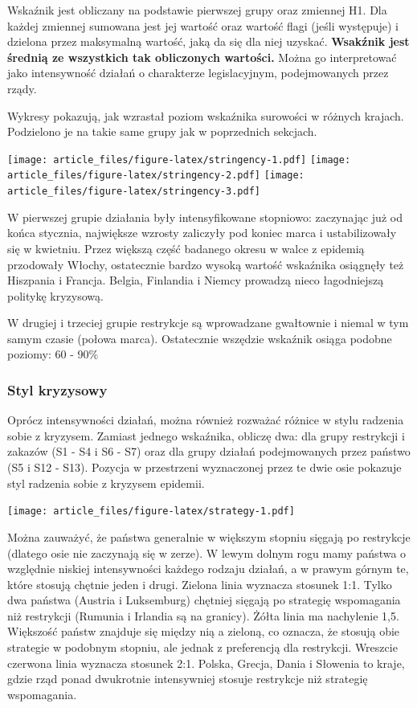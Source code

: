 \documentclass[
]{article}
\begin{document}
Wskaźnik jest obliczany na podstawie pierwszej grupy oraz zmiennej H1.
Dla każdej zmiennej sumowana jest jej wartość oraz wartość flagi (jeśli
występuje) i dzielona przez maksymalną wartość, jaką da się dla niej
uzyskać. \textbf{Wsakźnik jest średnią ze wszystkich tak obliczonych
wartości.} Można go interpretować jako intensywność działań o
charakterze legislacyjnym, podejmowanych przez rządy.

Wykresy pokazują, jak wzrastał poziom wskaźnika surowości w różnych
krajach. Podzielono je na takie same grupy jak w poprzednich sekcjach.

\texttt{[image: article\_files/figure-latex/stringency-1.pdf]}
\texttt{[image: article\_files/figure-latex/stringency-2.pdf]}
\texttt{[image: article\_files/figure-latex/stringency-3.pdf]}

W pierwszej grupie działania były intensyfikowane stopniowo: zaczynając
już od końca stycznia, największe wzrosty zaliczyły pod koniec marca i
ustabilizowały się w kwietniu. Przez większą część badanego okresu w
walce z epidemią przodowały Włochy, ostatecznie bardzo wysoką wartość
wskaźnika osiągnęły też Hiszpania i Francja. Belgia, Finlandia i Niemcy
prowadzą nieco łagodniejszą politykę kryzysową.

W drugiej i trzeciej grupie restrykcje są wprowadzane gwałtownie i
niemal w tym samym czasie (połowa marca). Ostatecznie wszędzie wskaźnik
osiąga podobne poziomy: 60 - 90\%

\hypertarget{styl-kryzysowy}{%
\subsubsection{Styl kryzysowy}\label{styl-kryzysowy}}

Oprócz intensywności działań, można również rozważać różnice w stylu
radzenia sobie z kryzysem. Zamiast jednego wskaźnika, obliczę dwa: dla
grupy restrykcji i zakazów (S1 - S4 i S6 - S7) oraz dla grupy działań
podejmowanych przez państwo (S5 i S12 - S13). Pozycja w przestrzeni
wyznaczonej przez te dwie osie pokazuje styl radzenia sobie z kryzysem
epidemii.

\texttt{[image: article\_files/figure-latex/strategy-1.pdf]}

Można zauważyć, że państwa generalnie w większym stopniu sięgają po
restrykcje (dlatego osie nie zaczynają się w zerze). W lewym dolnym rogu
mamy państwa o względnie niskiej intensywności każdego rodzaju działań,
a w prawym górnym te, które stosują chętnie jeden i drugi. Zielona linia
wyznacza stosunek 1:1. Tylko dwa państwa (Austria i Luksemburg) chętniej
sięgają po strategię wspomagania niż restrykcji (Rumunia i Irlandia są
na granicy). Żółta linia ma nachylenie 1,5. Większość państw znajduje
się między nią a zieloną, co oznacza, że stosują obie strategie w
podobnym stopniu, ale jednak z preferencją dla restrykcji. Wreszcie
czerwona linia wyznacza stosunek 2:1. Polska, Grecja, Dania i Słowenia
to kraje, gdzie rząd ponad dwukrotnie intensywniej stosuje restrykcje
niż strategię wspomagania.
\end{document}
